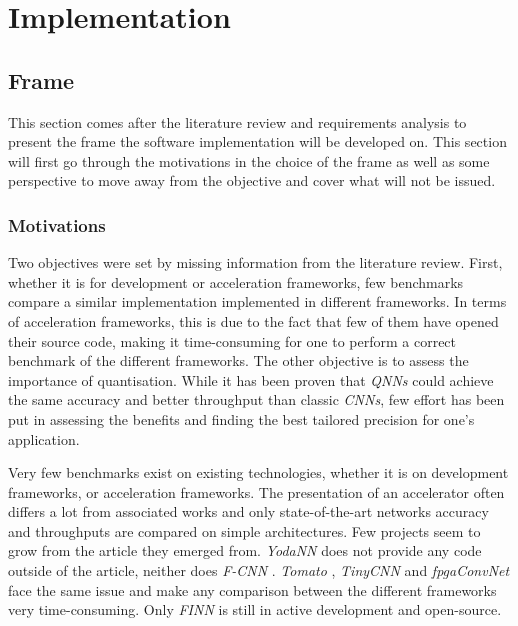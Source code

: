 \chapter{Implementation} %

\label{Chapters} %



\section{Frame}

This section comes after the literature review and requirements analysis to present the frame the software implementation will be developed on. This section will first go through the motivations in the choice of the frame as well as some perspective to move away from the objective and cover what will not be issued.


\subsection{Motivations}

Two objectives were set by missing information from the literature review. First, whether it is for development or acceleration frameworks, few benchmarks compare a similar implementation implemented in different frameworks. In terms of acceleration frameworks, this is due to the fact that few of them have opened their source code, making it time-consuming for one to perform a correct benchmark of the different frameworks. The other objective is to assess the importance of quantisation. While it has been proven that \emph{QNNs} could achieve the same accuracy and better throughput than classic \emph{CNNs}, few effort has been put in assessing the benefits and finding the best tailored precision for one's application.

Very few benchmarks exist on existing technologies, whether it is on development frameworks, or acceleration frameworks. The presentation of an accelerator often differs a lot from associated works and only state-of-the-art networks accuracy and throughputs are compared on simple architectures. Few projects seem to grow from the article they emerged from. \emph{YodaNN} \cite{Andri2016} does not provide any code outside of the article, neither does \emph{F-CNN} \cite{Zhao2016}. \emph{Tomato} \cite{Zhao2019}, \emph{TinyCNN} \cite{Jahanshahi2019} and \emph{fpgaConvNet} \cite{Venieris2017} face the same issue and make any comparison between the different frameworks very time-consuming. Only \emph{FINN} \cite{Umuroglu2017a, Blott2018} is still in active development and open-source.

